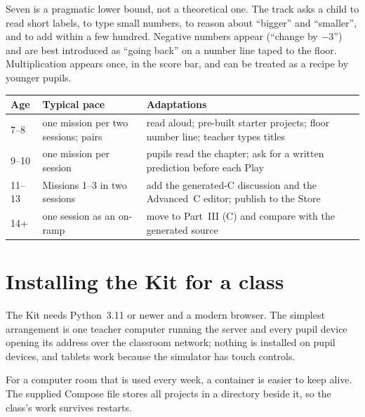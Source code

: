 Seven is a pragmatic lower bound, not a theoretical one. The track asks a
child to read short labels, to type small numbers, to reason about ``bigger''
and ``smaller'', and to add within a few hundred. Negative numbers appear
(``change by $-3$'') and are best introduced as ``going back'' on a number
line taped to the floor. Multiplication appears once, in the score bar, and
can be treated as a recipe by younger pupils.

\begin{center}
\begin{tabularx}{\linewidth}{@{}lXX@{}}
\toprule
Age & Typical pace & Adaptations \\
\midrule
7--8 & one mission per two sessions; pairs & read aloud; pre-built starter
  projects; floor number line; teacher types titles \\
9--10 & one mission per session & pupils read the chapter; ask for a written
  prediction before each Play \\
11--13 & Missions 1--3 in two sessions & add the generated-C discussion and
  the Advanced~C editor; publish to the Store \\
14+ & one session as an on-ramp & move to Part~III (C) and compare with the
  generated source \\
\bottomrule
\end{tabularx}
\label{tab:kitages}
\end{center}

\section{Installing the Kit for a class}

The Kit needs Python~3.11 or newer and a modern browser. The simplest
arrangement is one teacher computer running the server and every pupil device
opening its address over the classroom network; nothing is installed on pupil
devices, and tablets work because the simulator has touch controls.



For a computer room that is used every week, a container is easier to keep
alive. The supplied Compose file stores all projects in a 
directory beside it, so the class's work survives restarts.



